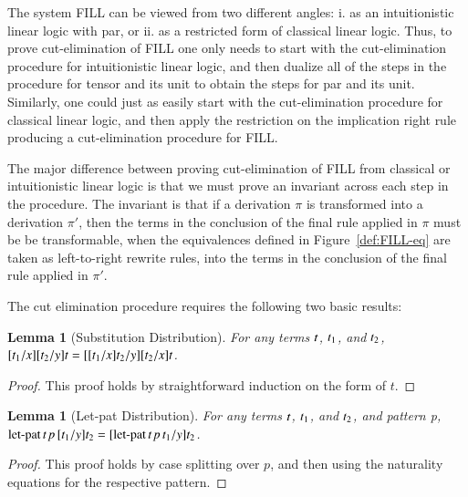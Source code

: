 \documentclass[preprint,12pt]{elsarticle}
\newtheorem{lemma}[theorem]{Lemma}
\begin{document}
The system FILL can be viewed from two different angles: i. as an intuitionistic
linear logic with par, or ii. as a restricted form of classical linear
logic.  Thus, to prove cut-elimination of FILL one only needs to start
with the cut-elimination procedure for intuitionistic linear logic,
and then dualize all of the steps in the procedure for tensor and its
unit to obtain the steps for par and its unit.  Similarly, one could
just as easily start with the cut-elimination procedure for classical
linear logic, and then apply the restriction on the implication right
rule producing a cut-elimination procedure for FILL.

The major difference between proving cut-elimination of FILL from
classical or intuitionistic linear logic is that we must prove an
invariant across each step in the procedure.  The invariant is that if
a derivation $\pi$ is transformed into a derivation $\pi'$, then the
terms in the conclusion of the final rule applied in $\pi$ must be be
transformable, when the equivalences defined in
Figure~\ref{def:FILL-eq} are taken as left-to-right rewrite rules,
into the terms in the conclusion of the final rule applied in $\pi'$.

\begin{report}
  The cut elimination procedure requires the following two basic
results:
\begin{lemma}[Substitution Distribution]
  \label{lemma:substitution_distribution}
  For any terms $\mathit{t}$, $\mathit{t_{{\mathrm{1}}}}$, and $\mathit{t_{{\mathrm{2}}}}$, $[  \mathit{t_{{\mathrm{1}}}}  /  \mathit{x}  ]  [  \mathit{t_{{\mathrm{2}}}}  /  \mathit{y}  ]  \mathit{t} = [  [  \mathit{t_{{\mathrm{1}}}}  /  \mathit{x}  ]  \mathit{t_{{\mathrm{2}}}}  /  \mathit{y}  ]  [  \mathit{t_{{\mathrm{2}}}}  /  \mathit{x}  ]  \mathit{t}$.
\end{lemma}
\begin{proof}
  This proof holds by straightforward induction on the form of $t$.
\end{proof}

\begin{lemma}[Let-pat Distribution]
  \label{lemma:let-pat_distribution}
  For any terms $\mathit{t}$, $\mathit{t_{{\mathrm{1}}}}$, and $\mathit{t_{{\mathrm{2}}}}$, and pattern p, \\
  $ \mathsf{\operatorname{let-pat} }\, \mathit{t} \, \mathit{p} \, [  \mathit{t_{{\mathrm{1}}}}  /  \mathit{y}  ]  \mathit{t_{{\mathrm{2}}}}  = [   \mathsf{\operatorname{let-pat} }\, \mathit{t} \, \mathit{p} \, \mathit{t_{{\mathrm{1}}}}   /  \mathit{y}  ]  \mathit{t_{{\mathrm{2}}}}$.
\end{lemma}
\begin{proof}
  This proof holds by case splitting over $p$, and then using the
  naturality equations for the respective pattern.
\end{proof}
\end{report}
\end{document}
